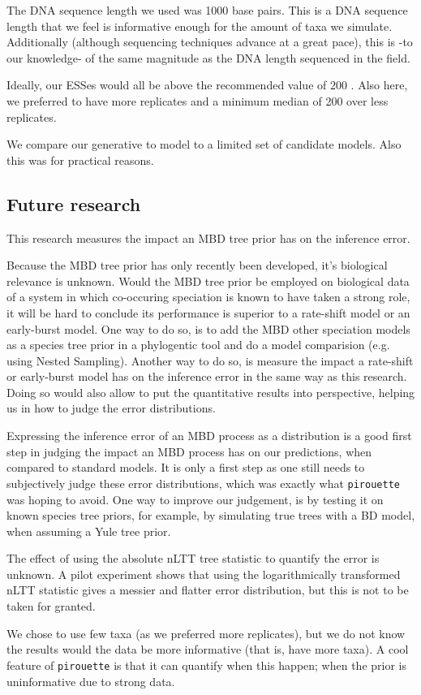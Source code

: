 The DNA sequence length we used was 1000 base pairs. This is a DNA
sequence length that we  feel is informative enough
for the amount of taxa we simulate. Additionally (although sequencing
techniques advance at a great pace), this is -to our knowledge- 
of the same magnitude as the DNA length sequenced in the field.

Ideally, our ESSes would all be above the recommended value of 
200 . Also here, we preferred to have more replicates
and a minimum median of 200 over less replicates. 

We compare our generative to model to  
a limited set of candidate models. Also this was for practical
reasons.

\subsection{Future research}

This research measures the impact an MBD tree prior 
has on the inference error. 

Because the MBD tree prior has only recently been 
developed, it's biological relevance is unknown.
Would the MBD tree prior be employed on biological data of a system
in which co-occuring speciation is known to have taken a strong role,
it will be hard to conclude its performance is superior to a
rate-shift model or an early-burst model. One way to do so, is
to add the MBD other speciation models as a species tree prior
in a phylogentic tool and do a model comparision (e.g. using Nested Sampling).
Another way to do so, is measure the impact a rate-shift or early-burst model
has on the inference error in the same way as this research.
Doing so would also allow to put the quantitative results into perspective,
helping us in how to judge the error distributions. 

Expressing the inference error of an MBD process as a distribution
is a good first step in judging the impact an MBD process has on
our predictions, when compared to standard models. It is only a first
step as one still needs to subjectively judge these error distributions,
which was exactly what \verb;pirouette; was hoping to avoid. 
One way to improve our judgement, is by testing it on known species tree
priors, for example, by simulating true trees with a BD model, when assuming
a Yule tree prior.  

The effect of using the absolute nLTT tree statistic to quantify the error
is unknown. A pilot experiment  shows that
using the logarithmically transformed nLTT statistic gives a messier and
flatter error distribution, but this is not to be taken for granted.

We chose to use few taxa (as we preferred more replicates), but we do not
know the results would the data be more informative (that is, have more taxa).
A cool feature of \verb;pirouette; is that it can quantify when this happen;
when the prior is uninformative due to strong data.